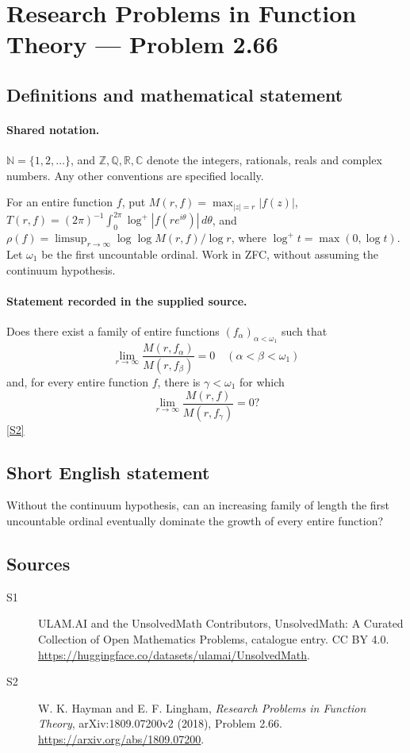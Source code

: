\documentclass[11pt]{article}
\newcommand{\sref}[2]{\hyperlink{source:#1:#2}{[S#2]}}
\begin{document}
\section{Research Problems in Function Theory — Problem 2.66}\label{statement}

\subsection{Definitions and mathematical statement}

\paragraph{Shared notation.}$\mathbb N=\{1,2,\ldots\}$, and $\mathbb Z,\mathbb Q,\mathbb R,\mathbb C$ denote the integers, rationals, reals and complex numbers. Any other conventions are specified locally.


For an entire function $f$, put $M(r,f)=\max_{|z|=r}|f(z)|$, $T(r,f)=(2\pi)^{-1}\int_0^{2\pi}\log^+|f(re^{i\theta})|\,d\theta$, and $\rho(f)=\limsup_{r\to\infty}\log\log M(r,f)/\log r$, where $\log^+t=\max(0,\log t)$. Let $\omega_1$ be the first uncountable ordinal. Work in ZFC, without assuming the continuum hypothesis.
\paragraph{Statement recorded in the supplied source.}
Does there exist a family of entire functions $(f_\alpha)_{\alpha<\omega_1}$ such that
\[
\lim_{r\to\infty}\frac{M(r,f_\alpha)}{M(r,f_\beta)}=0\quad(\alpha<\beta<\omega_1)
\]
and, for every entire function $f$, there is $\gamma<\omega_1$ for which
\[\lim_{r\to\infty}\frac{M(r,f)}{M(r,f_\gamma)}=0?\] \sref{statement}{2}
\subsection{Short English statement}
Without the continuum hypothesis, can an increasing family of length the first uncountable ordinal eventually dominate the growth of every entire function?
\subsection{Sources}
\begin{description}
\item[\hypertarget{source:statement:1}{S1}] ULAM.AI and the UnsolvedMath Contributors, UnsolvedMath: A Curated Collection of Open Mathematics Problems, catalogue entry. CC BY 4.0. \url{https://huggingface.co/datasets/ulamai/UnsolvedMath}.
\item[\hypertarget{source:statement:2}{S2}] W. K. Hayman and E. F. Lingham, \emph{Research Problems in Function Theory}, arXiv:1809.07200v2 (2018), Problem 2.66. \url{https://arxiv.org/abs/1809.07200}.
\end{description}
\label{end:statement}
\end{document}
